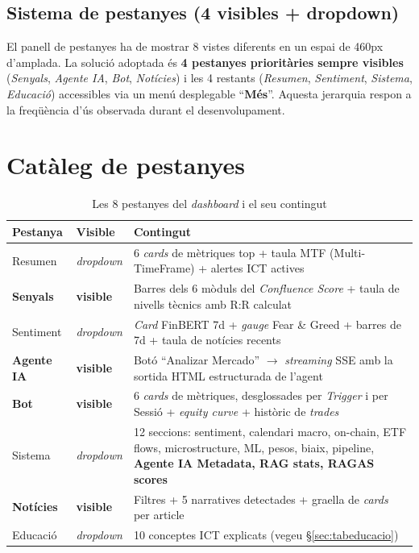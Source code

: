\documentclass[12pt, a4paper]{report}
\begin{document}
\subsection{Sistema de pestanyes (4 visibles + dropdown)}

El panell de pestanyes ha de mostrar 8 vistes diferents en un espai de 460px d'amplada. La solució adoptada és \textbf{4 pestanyes prioritàries sempre visibles} (\textit{Senyals}, \textit{Agente IA}, \textit{Bot}, \textit{Notícies}) i les 4 restants (\textit{Resumen}, \textit{Sentiment}, \textit{Sistema}, \textit{Educació}) accessibles via un menú desplegable ``\textbf{Més}''. Aquesta jerarquia respon a la freqüència d'ús observada durant el desenvolupament.

\section{Catàleg de pestanyes}

\begin{table}[H]
\centering
\caption{Les 8 pestanyes del \textit{dashboard} i el seu contingut}
\label{tab:tabsdashboard}
\begin{tabular}{@{}L{2.3cm}L{1.8cm}L{8.5cm}@{}}
\toprule
\textbf{Pestanya} & \textbf{Visible} & \textbf{Contingut} \\
\midrule
Resumen     & \textit{dropdown} & 6 \textit{cards} de mètriques top + taula MTF (Multi-TimeFrame) + alertes ICT actives \\
\textbf{Senyals}     & \textbf{visible}  & Barres dels 6 mòduls del \textit{Confluence Score} + taula de nivells tècnics amb R:R calculat \\
Sentiment   & \textit{dropdown} & \textit{Card} FinBERT 7d + \textit{gauge} Fear \& Greed + barres de 7d + taula de notícies recents \\
\textbf{Agente IA}   & \textbf{visible}  & Botó ``Analizar Mercado'' $\to$ \textit{streaming} SSE amb la sortida HTML estructurada de l'agent \\
\textbf{Bot}         & \textbf{visible}  & 6 \textit{cards} de mètriques, desglossades per \textit{Trigger} i per Sessió + \textit{equity curve} + històric de \textit{trades} \\
Sistema     & \textit{dropdown} & 12 seccions: sentiment, calendari macro, on-chain, ETF flows, microstructure, ML, pesos, biaix, pipeline, \textbf{Agente IA Metadata, RAG stats, RAGAS scores} \\
\textbf{Notícies}    & \textbf{visible}  & Filtres + 5 narratives detectades + graella de \textit{cards} per article \\
Educació    & \textit{dropdown} & 10 conceptes ICT explicats (vegeu \S\ref{sec:tabeducacio}) \\
\bottomrule
\end{tabular}
\end{table}
\end{document}

